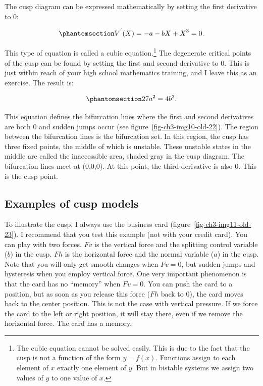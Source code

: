 \documentclass[
  a4paper,
  DIV=11,
  numbers=noendperiod,
  oneside]{scrreprt}
\begin{document}
The cusp diagram can be expressed mathematically by setting the first
derivative to 0:

\begin{equation}\phantomsection\label{eq-ch3-5-old-9}{
V^{'}(X) = {- a - bX + X}^{3} = 0.
}\end{equation}

This type of equation is called a cubic equation.\footnote{The cubic
  equation cannot be solved easily. This is due to the fact that the
  cusp is not a function of the form \(y = f(x)\). Functions assign to
  each element of \(x\) exactly one element of \(y\). But in bistable
  systems we assign two values of \(y\) to one value of \(x\).} The
degenerate critical points of the cusp can be found by setting the first
and second derivative to 0. This is just within reach of your high
school mathematics training, and I leave this as an exercise. The result
is:

\begin{equation}\phantomsection\label{eq-ch3-6-old-10}{
27a^{2} = 4b^{3}.
}\end{equation}

This equation defines the bifurcation lines where the first and second
derivatives are both 0 and sudden jumps occur (see
figure~\ref{fig-ch3-img10-old-22}). The region between the bifurcation
lines is the bifurcation set. In this region, the cusp has three fixed
points, the middle of which is unstable. These unstable states in the
middle are called the inaccessible area, shaded gray in the cusp
diagram. The bifurcation lines meet at (0,0,0). At this point, the third
derivative is also 0. This is the cusp point.

\subsection{Examples of cusp models}\label{sec-Examples-of-cusp-models}

To illustrate the cusp, I always use the business card
(figure~\ref{fig-ch3-img11-old-23}). I recommend that you test this
example (not with your credit card). You can play with two forces.
\(Fv\) is the vertical force and the splitting control variable (\(b\))
in the cusp. \(Fh\) is the horizontal force and the normal variable
(\(a\)) in the cusp. Note that you will only get smooth changes when
\(Fv = 0\), but sudden jumps and hysteresis when you employ vertical
force. One very important phenomenon is that the card has no ``memory''
when \(Fv = 0\). You can push the card to a position, but as soon as you
release this force (\(Fh\) back to 0), the card moves back to the center
position. This is not the case with vertical pressure. If we force the
card to the left or right position, it will stay there, even if we
remove the horizontal force. The card has a memory.
\end{document}
